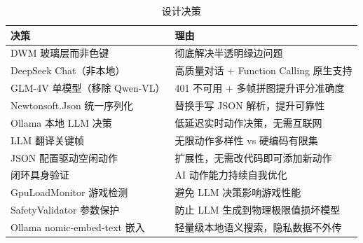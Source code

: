 \documentclass[12pt,a4paper]{ctexart}
\begin{document}
\begin{table}[H]
\centering
\caption{设计决策}
\label{tab:decisions}
\begin{tabular}{lp{8cm}}
\toprule
\textbf{决策} & \textbf{理由} \\
\midrule
DWM 玻璃层而非色键 & 彻底解决半透明绿边问题 \\
DeepSeek Chat（非本地） & 高质量对话 + Function Calling 原生支持 \\
GLM-4V 单模型（移除 Qwen-VL） & 401 不可用 + 多帧拼图提升评分准确度 \\
Newtonsoft.Json 统一序列化 & 替换手写 JSON 解析，提升可靠性 \\
Ollama 本地 LLM 决策 & 低延迟实时动作决策，无需互联网 \\
LLM 翻译关键帧 & 无限动作多样性 vs 硬编码有限集 \\
JSON 配置驱动空闲动作 & 扩展性，无需改代码即可添加新动作 \\
闭环具身验证 & AI 动作能力持续自我优化 \\
GpuLoadMonitor 游戏检测 & 避免 LLM 决策影响游戏性能 \\
SafetyValidator 参数保护 & 防止 LLM 生成到物理极限值损坏模型 \\
Ollama nomic-embed-text 嵌入 & 轻量级本地语义搜索，隐私数据不外传 \\
\bottomrule
\end{tabular}
\end{table}
\end{document}
